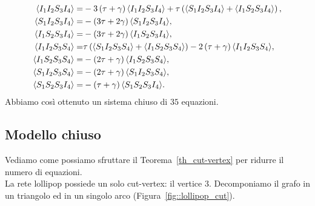 \begin{equation*}
 	\begin{aligned}	
 	\langle I_1I_2S_3I_4 \rangle = &- 3\left(  \tau +\gamma \right) \langle  I_1 I_2 S_3 I_4 \rangle + \tau \left( \langle  S_1 I_2 S_3 I_4  \rangle +\langle  I_1 S_2 S_3 I_4 \rangle \right), \\
 	\langle S_1I_2S_3I_4 \rangle=& -\left(  3\tau + 2\gamma \right)  	\langle S_1I_2S_3I_4 \rangle,\\
 	\langle I_1S_2S_3I_4 \rangle=&-\left(  3\tau + 2\gamma \right)\langle I_1S_2S_3I_4 \rangle,\\
 	\langle I_1I_2S_3S_4 \rangle=& \tau \left( \langle S_1 I_2 S_3S_4 \rangle +\langle  I_1 S_2 S_3S_4 \rangle \right) -2\left(  \tau+\gamma \right) \langle I_1I_2S_3S_4 \rangle,\\
 	\langle I_1S_2S_3S_4 \rangle=&-\left(  2\tau + \gamma \right) \langle I_1S_2S_3S_4 \rangle,\\
 	\langle S_1I_2S_3S_4 \rangle=&-\left(  2\tau + \gamma \right) \langle S_1I_2S_3S_4 \rangle,\\
 	\langle S_1S_2S_3I_4 \rangle=&-\left(  \tau + \gamma \right) \langle S_1S_2S_3I_4 \rangle.\\	
 	\end{aligned}
\end{equation*}
Abbiamo cos\`i ottenuto un sistema chiuso di $35$ equazioni.
\newpage
\subsection{Modello chiuso}
Vediamo come possiamo sfruttare il Teorema~\ref{th_cut-vertex} per ridurre il numero di equazioni.\\
La rete lollipop possiede un solo cut-vertex: il vertice $3$. Decomponiamo il grafo in un triangolo ed in un singolo arco (Figura~\ref{fig::lollipop_cut}).

